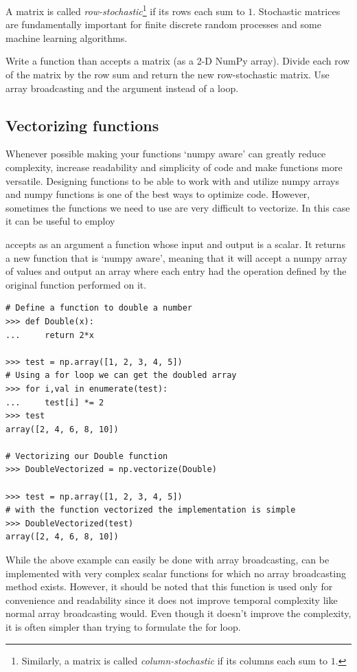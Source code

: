 \begin{problem} %
A matrix is called \emph{row-stochastic}\footnote{Similarly, a matrix is called \emph{column-stochastic} if its columns each sum to $1$.} if its rows each sum to $1$.
Stochastic matrices are fundamentally important for finite discrete random processes and some machine learning algorithms.

Write a function than accepts a matrix (as a 2-D NumPy array).
Divide each row of the matrix by the row sum and return the new row-stochastic matrix.
Use array broadcasting and the  argument instead of a loop.
\end{problem}

\subsection*{Vectorizing functions}

Whenever possible making your functions `numpy aware' can greatly reduce complexity, increase readability and simplicity of code and make functions more versatile.
Designing functions to be able to work with and utilize numpy arrays and numpy functions is one of the best ways to optimize code.
However, sometimes the functions we need to use are very difficult to vectorize.
In this case it can be useful to employ 

 accepts as an argument a function whose input and output is a scalar.
It returns a new function that is `numpy aware', meaning that it will accept a numpy array of values and output an array where each entry had the operation defined by the original function performed on it.

\begin{lstlisting}
# Define a function to double a number
>>> def Double(x):
...		return 2*x

>>> test = np.array([1, 2, 3, 4, 5])
# Using a for loop we can get the doubled array
>>> for i,val in enumerate(test):
...		test[i] *= 2
>>> test
array([2, 4, 6, 8, 10])

# Vectorizing our Double function
>>> DoubleVectorized = np.vectorize(Double)

>>> test = np.array([1, 2, 3, 4, 5])
# with the function vectorized the implementation is simple
>>> DoubleVectorized(test)
array([2, 4, 6, 8, 10])

\end{lstlisting}

\begin{info} %

While the above example can easily be done with array broadcasting,  can be implemented with very complex scalar functions for which no array broadcasting method exists.
However, it should be noted that this function is used only for convenience and readability since it does not improve temporal complexity like normal array broadcasting would.
Even though it doesn't improve the complexity, it is often simpler than trying to formulate the for loop.

\end{info}


